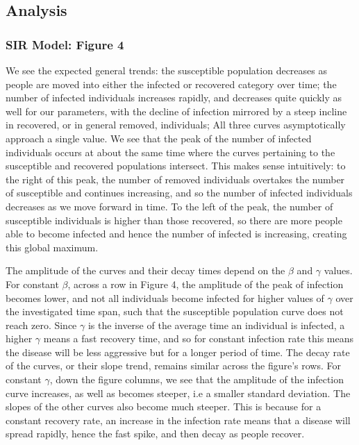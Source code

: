 \documentclass[12pt]{article}
\begin{document}
\pagebreak

\subsection{Analysis}
\label{subsec:AnalysisQ2}

\subsubsection{SIR Model: Figure 4}
We see the expected general trends: the susceptible population decreases as people are moved into either the infected or recovered category over time; the number of infected individuals increases rapidly, and decreases quite quickly as well for our parameters, with the decline of infection mirrored by a steep incline in recovered, or in general removed, individuals; All three curves asymptotically approach a single value. We see that the peak of the number of infected individuals occurs at about the same time where the curves pertaining to the susceptible and recovered populations intersect. This makes sense intuitively: to the right of this peak, the number of removed individuals overtakes the number of susceptible and continues increasing, and so the number of infected individuals decreases as we move forward in time. To the left of the peak, the number of susceptible individuals is higher than those recovered, so there are more people able to become infected and hence the number of infected is increasing, creating this global maximum. 

The amplitude of the curves and their decay times depend on the $\beta$ and $\gamma$ values. For constant $\beta$, across a row in Figure 4, the amplitude of the peak of infection becomes lower, and not all individuals become infected for higher values of $\gamma$ over the investigated time span, such that the susceptible population curve does not reach zero. Since $\gamma$ is the inverse of the average time an individual is infected, a higher $\gamma$ means a fast recovery time, and so for constant infection rate this means the disease will be less aggressive but for a longer period of time. The decay rate of the curves, or their slope trend, remains similar across the figure's rows. For constant $\gamma$, down the figure columns, we see that the amplitude of the infection curve increases, as well as becomes steeper, i.e a smaller standard deviation. The slopes of the other curves also become much steeper. This is because for a constant recovery rate, an increase in the infection rate means that a disease will spread rapidly, hence the fast spike, and then decay as people recover. 
\end{document}
